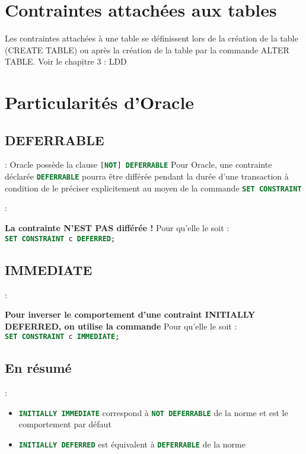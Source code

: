 \documentclass[10pt]{beamer}
\begin{document}
\section{Contraintes attachées aux tables}
\begin{frame}{\secname}
    Les contraintes attachées à une table se définissent lors de la création de la table (CREATE TABLE) ou après la création de la table par la commande ALTER TABLE.
    Voir le chapitre 3 : LDD
\end{frame}

\section{Particularités d'Oracle}
\subsection{DEFERRABLE}
\begin{frame}{\secname : \subsecname}
    Oracle possède la clause \lstinline[language=sql]![NOT] DEFERRABLE!
    Pour Oracle, une contrainte déclarée \lstinline[language=sql]!DEFERRABLE! pourra être différée pendant la durée d'une transaction à condition de le préciser explicitement au moyen de la commande \lstinline[language=sql]!SET CONSTRAINT!
\end{frame}

\begin{frame}{\secname : \subsecname}
    
    \textbf{La contrainte N'EST PAS différée !}
    Pour qu'elle le soit : \\
    \lstinline[language=sql]!SET CONSTRAINT c DEFERRED;!
\end{frame}
\subsection{IMMEDIATE}

\begin{frame}{\secname : \subsecname}
    
    \textbf{Pour inverser le comportement d'une contraint INITIALLY DEFERRED, on utilise la commande}
    Pour qu'elle le soit : \\
    \lstinline[language=sql]!SET CONSTRAINT c IMMEDIATE;!
\end{frame}

\subsection{En résumé}
\begin{frame}{\secname : \subsecname}
    \begin{itemize}
        \item \lstinline[language=sql]!INITIALLY IMMEDIATE! correspond à \lstinline[language=sql]!NOT DEFERRABLE! de la norme et est le comportement par défaut
        \item \lstinline[language=sql]!INITIALLY DEFERRED! est équivalent à \lstinline[language=sql]!DEFERRABLE! de la norme
    \end{itemize}
\end{frame}
\end{document}
